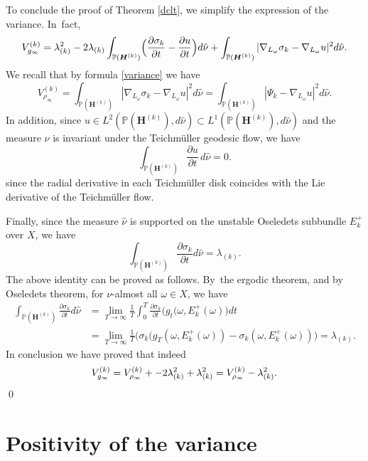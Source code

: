 \documentclass[JEP,XML,SOM,Unicode,published]{cedram}
\theoremstyle{plain}
\theoremstyle{definition}
\numberwithin{equation}{subsection}
\newcommand\bP{\mathbb{P}}
\let\gradient\nabla
\newcommand{\bfH}{\boldsymbol{H}}
\begin{document}
To conclude the proof of Theorem \ref{dclt}, we simplify the
expression of the variance. In~fact,
\[
V^{(k)}_{g_\infty}= \lambda_{(k)}^2 -2 \lambda_{(k)}\int_{\bP(\bfH^{(k)})} \Bigl(\frac{\partial\sigma_k}{\partial t}-\frac{\partial u}{\partial t} \Bigr) d \hat \nu + \int_{\bP(\bfH^{(k)})} | \gradient_{L_\omega}\sigma_k - \gradient_{L_\omega}u|^2 d \hat \nu.
\]
We recall that by formula \eqref{variance} we have
\[
V^{(k)}_{\rho_\infty}=\int_{\bP(\bfH^{(k)})} | \gradient_{L_\omega}\sigma_k - \gradient_{L_\omega}u|^2 d \hat \nu =\int_{\bP(\bfH^{(k)})} |\Psi_k -\gradient_{L_\omega}u|^2 d\hat{\nu}.
\]
In addition, since $u \in L^2(\bP(\bfH^{(k)}), d\hat\nu)
\subset L^1(\bP(\bfH^{(k)}), d\hat\nu)$ and the measure
$\hat \nu$ is invariant under the Teichmüller geodesic flow, we have
\[
\int_{\bP(\bfH^{(k)})} \frac{\partial u}{\partial t} \, d \hat \nu =0.
\]
since the radial derivative in each Teichmüller disk coincides with
the Lie derivative of the Teichmüller flow.

Finally, since the measure $\hat \nu$ is supported on the unstable Oseledets subbundle $E^+_k$ over $X$, we have
\[
\int_{\bP(\bfH^{(k)})} \frac{\partial\sigma_k}{\partial t} d \hat \nu =\lambda_{(k)}.
\]
The above identity can be proved as follows. By~the ergodic theorem, and by Oseledets theorem, for $\nu$-almost all $\omega \in X$, we have
\[
\begin{aligned}
\int_{\bP(\bfH^{(k)})} \frac{\partial\sigma_k}{\partial t} d \hat \nu &= \lim_{T\to \infty}\frac{1}{T} \int_0^T \frac{\partial\sigma_k}{\partial t} \bigl(g_t(\omega, E^+_k(\omega)\bigr) dt \\ & = \lim_{T\to \infty} \frac{1}{T} \Big(\sigma_k(g_T(\omega, E^+_k(\omega)) -
\sigma_k(\omega, E^+_k(\omega)) \Big) = \lambda_{(k)}.
\end{aligned}
\]
In conclusion we have proved that indeed
\begin{equation}\label{dvarianceformula}
V^{(k)}_{g_\infty}= V^{(k)}_{\rho_\infty} + - 2\lambda_{(k)}^2 + \lambda_{(k)}^2 = V^{(k)}_{\rho_\infty}- \lambda_{(k)}^2.
\vspace*{-1.3\baselineskip}
\end{equation}
\qed
\vspace*{\baselineskip}

\section{Positivity of the variance}\label{posvar}
\end{document}
